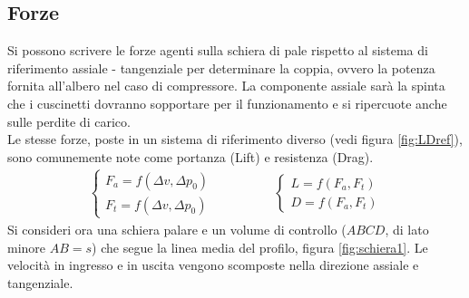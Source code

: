 \subsection{Forze}
Si possono scrivere le forze agenti sulla schiera di pale rispetto al sistema di riferimento assiale - tangenziale per determinare la coppia, ovvero la potenza fornita all'albero nel caso di compressore. La componente assiale sarà la spinta che i cuscinetti dovranno sopportare per il funzionamento e si ripercuote anche sulle perdite di carico.\\
Le stesse forze, poste in un sistema di riferimento diverso (vedi figura \ref{fig:LDref}), sono comunemente note come portanza (Lift) e resistenza (Drag).\\
\begin{align*}
	\begin{cases}
		F_a = f(\Delta v, \Delta p_0)\\
		F_t = f(\Delta v, \Delta p_0)
	\end{cases} \hspace{2cm}
	\begin{cases}
	L = f(F_a,F_t)\\
	D = f(F_a,F_t)
	\end{cases}
\end{align*}
Si consideri ora una schiera palare e un volume di controllo ($ABCD$, di lato minore $AB=s$) che segue la linea media del profilo, figura \ref{fig:schiera1}. Le velocità in ingresso e in uscita vengono scomposte nella direzione assiale e tangenziale. 
